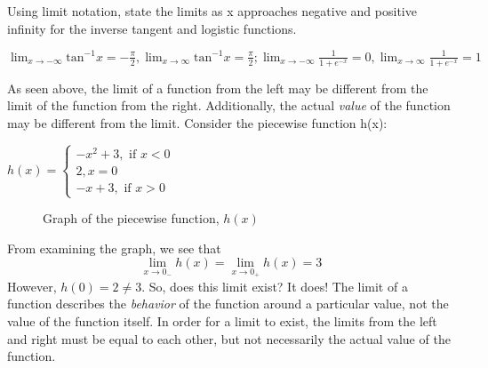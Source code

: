 \begin{Exercise}[title=Limits Practice 3, label=limits3]
Using limit notation, state the limits as x approaches negative and positive 
infinity for the inverse tangent and logistic functions.
  \vspace{40mm}
\end{Exercise}
\begin{Answer}[ref=limits3] 
	$ \lim_{x \rightarrow -\infty} \text{tan}^{-1}x = -\frac{\pi}{2}, \lim_{x \rightarrow \infty} \text{tan}^{-1}x = \frac{\pi}{2}; \lim_{x \rightarrow -\infty} \frac{1}{1 + e^{-x}} = 0, \lim_{x \rightarrow \infty} \frac{1}{1 + e^{-x}} = 1 $
\end{Answer}


As seen above, the limit of a function from the left may be different from the 
limit of the function from the right. Additionally, the actual \textit{value} of 
the function may be different from the limit. Consider the piecewise function h(x):

$h(x) = \begin{cases}
    -x^2+3, \text{ if } x < 0\\
    2, x=0\\
    -x+3, \text{ if } x > 0
\end{cases}$

\begin{figure}[htbp]
\centering
{}
\caption{Graph of the piecewise function, $h(x)$}
\end{figure}


From examining the graph, we see that $$\lim_{x\to0_-}h(x) = \lim_{x\to0_+}h(x) = 3$$
However, $h(0) = 2 \neq 3$. So, does this limit exist? It does! The limit of a 
function describes the \textit{behavior} of the function around a particular value, 
not the value of the function itself. In order for a limit to exist, the limits 
from the left and right must be equal to each other, but not necessarily the actual 
value of the function. 

